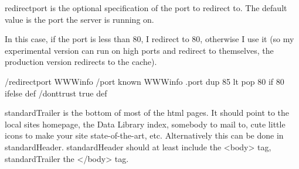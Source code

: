 \documentclass{article}
\begin{document}
redirectport is the optional specification of the port to redirect to.
The default value is the port the server is running on.

In this case, if the port is less than 80, I redirect to 80, otherwise
I use it (so my experimental version can run on high ports and
redirect to themselves, the production version redirects to the cache).
\begin{ingrid}
/redirectport {
WWWinfo /port known
{WWWinfo .port dup 85 lt { pop 80} if}
{80} ifelse
} def
/donttrust true  def
\end{ingrid}
standardTrailer is the bottom of most of the html pages.  It should
point to the local sites homepage, the Data Library index, somebody to
mail to, cute little icons to make your site state-of-the-art, etc.
Alternatively this can be done in standardHeader.  standardHeader
should at least include the <body> tag, standardTrailer the </body> tag.
\end{document}
